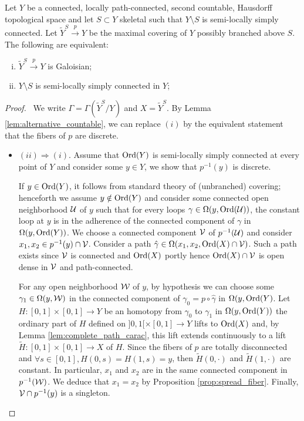 \begin{prop} \label{prop:Galoisian_semilocal}
Let $Y$ be a connected, locally path-connected, second countable, Hausdorff topological space and let $S\subset Y$ skeletal such that $Y\setminus S$ is semi-locally simply connected.
Let $\widetilde Y^S\xrightarrow{p} Y$ be the maximal covering of $Y$ possibly branched  above $S$. The following are equivalent:
\begin{enumerate}[(i)]
\item $\widetilde Y^S\xrightarrow{p} Y$  is Galoisian;
  \item $Y\setminus S$ is semi-locally simply connected in $Y$;
\end{enumerate}
\end{prop}
\begin{proof}\
We write $\Gamma = \Gamma(\widetilde Y^S/Y)$ and $X = \widetilde Y^S$. By Lemma \ref{lem:alternative_countable}, we can replace $(i)$ by the equivalent statement that the fibers of $p$ are discrete. 

  \begin{itemize}

   \item $(ii)\Rightarrow (i)$. Assume that $\mathrm{Ord}(Y)$ is semi-locally simply connected at every point of $Y$ and consider some $y\in Y$, we show that $p^{-1}(y)$ is discrete.
   
   If $y\in \mathrm{Ord}(Y)$, it follows from standard theory of (unbranched) covering; henceforth we assume $y\notin \mathrm{Ord}(Y)$ and consider some connected open neighborhood $\mathcal{U}$ of $y$ such that for every loops $\gamma\in\Omega(y,\mathrm{Ord}(\mathcal{U}))$,  the constant loop at $y$ is in the adherence of the connected component of $\gamma$ in  $\Omega(y,\mathrm{Ord}(Y))$. We choose a connected component $\mathcal V$ of $p^{-1}(\mathcal{U})$ and consider $x_1,x_2 \in p^{-1}(y)\cap \mathcal V$.  Consider a path $\hat\gamma\in \Omega(x_1,x_2,\mathrm{Ord}(X)\cap \mathcal V)$. Such a path exists since $\mathcal V$ is connected and $\mathrm{Ord}(X)$ portly hence $\mathrm{Ord}(X)\cap \mathcal V$ is open dense in $\mathcal V$ and path-connected. 
   
   For any open neighborhood $\mathcal W$ of $y$, by hypothesis we can choose some $\gamma_1\in \Omega(y,\mathcal W)$ in the connected component of $\gamma_0=p\circ \hat\gamma$ in $\Omega(y,\mathrm{Ord}(Y)$.  Let $H:[0,1]\times[0,1]\rightarrow Y$ be an homotopy from $\gamma_0$ to $\gamma_1$ in $\Omega(y,\mathrm{Ord}(Y))$ the ordinary part of $H$ defined on 
   $]0,1[\times [0,1]\rightarrow Y$ lifts to $\mathrm{Ord}(X)$ and, by Lemma \ref{lem:complete_path_carac}, this lift extends continuously to a lift $\widetilde H:[0,1]\times [0,1]\rightarrow X$ of $H$. Since the fibers of $p$ are totally disconnected and $\forall s\in [0,1], H(0,s)=H(1,s)=y$, then $\widetilde H(0,\cdot)$ and $\widetilde H(1,\cdot)$ are constant. In particular, $x_1$ and $x_2$ are in the same connected component in $p^{-1}(\mathcal W)$. We deduce that $x_1=x_2$ by Proposition \ref{prop:spread_fiber}. Finally, $\mathcal V\cap p^{-1}(y)$  is a singleton.
   

\end{itemize}
\end{proof}
